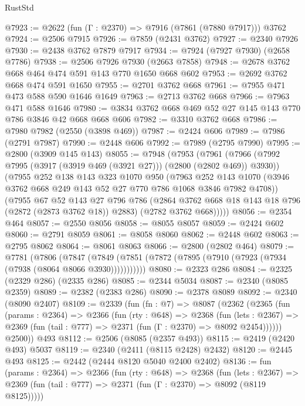 \begin{lexlean}{RustStd}
\begin{coremodule}
@7923 := @2622 (fun (Γ : @2370) => @7916 (@7861 (@7880 @7917))) @3762
@7924 := @2506 @7915
@7926 := @7859 (@2431 @3762)
@7927 := @2340 @7926
@7930 := @2438 @3762 @7879 @7917
@7934 := @7924 (@7927 @7930) (@2658 @7786)
@7938 := @2506 @7926 @7930 (@2663 @7858)
@7948 := @2678 @3762 @668 @464 @474 @591 @143 @770 @1650 @668 @602
@7953 := @2692 @3762 @668 @474 @591 @1650
@7955 := @2701 @3762 @668
@7961 := @7955 @471 @473 @588 @590 @1646 @1649
@7963 := @2713 @3762 @668
@7966 := @7963 @471 @588 @1646
@7980 := @3834 @3762 @668 @469 @52 @27 @145 @143 @770 @786 @3846 @42 @668 @668 @606
@7982 := @3310 @3762 @668
@7986 := @7980 @7982 (@2550 (@3898 @469))
@7987 := @2424 @606
@7989 := @7986 (@2791 @7987)
@7990 := @2448 @606
@7992 := @7989 (@2795 @7990)
@7995 := @2800 (@3909 @145 @143)
@8055 := @7948
    (@7953
      (@7961
        (@7966 (@7992 @7995 (@3917 (@3919 @469 (@3921 @27))) (@2800 (@2802 @469)) @3930))
        (@7955
          @252
          @138
          @143
          @323
          @1070
          @950
          (@7963
            @252
            @143
            @1070
            (@3946 @3762 @668 @249 @143 @52 @27 @770 @786 @1068 @3846 @7982 @4708))
          (@7955
            @67
            @52
            @143
            @27
            @796
            @786
            (@2864 @3762 @668 @18 @143 @18 @796 (@2872 (@2873 @3762 @18)) @2883)
            (@2782 @3762 @668)))))
@8056 := @2354 @464
@8057 := @2550 @8056
@8058 := @8055 @8057
@8059 := @2424 @602
@8060 := @2791 @8059
@8061 := @8058 @8060
@8062 := @2448 @602
@8063 := @2795 @8062
@8064 := @8061 @8063
@8066 := @2800 (@2802 @464)
@8079 := @7781
    (@7806
      (@7847 (@7849 (@7851 (@7872 (@7895 (@7910 (@7923 (@7934 (@7938 (@8064 @8066 @3930)))))))))))
@8080 := @2323 @286
@8084 := @2325 (@2329 @286) (@2335 @286)
@8085 := @2344 @5034
@8087 := @2340 (@8085 @2359)
@8089 := @2382 (@2383 @286)
@8090 := @2378 @8089
@8092 := @2340 (@8090 @2407)
@8109 := @2339
    (fun (fn : @7) =>
    @8087
      (@2362
        (@2365
          (fun (params : @2364) =>
          @2366
            (fun (rty : @648) =>
            @2368
              (fun (lets : @2367) =>
              @2369 (fun (tail : @777) => @2371 (fun (Γ : @2370) => @8092 @2454))))))
        @2500))
    @493
@8112 := @2506 (@8085 (@2357 @493))
@8115 := @2419 (@2420 @493) @5037
@8119 := @2340 (@2411 (@8115 @2428) @2432)
@8120 := @2445 @493
@8125 := @2442 (@2444 @8120 @5040 @2400 @2402)
@8136 := fun (params : @2364) =>
  @2366
    (fun (rty : @648) =>
    @2368
      (fun (lets : @2367) =>
      @2369 (fun (tail : @777) => @2371 (fun (Γ : @2370) => @8092 (@8119 @8125)))))

\end{coremodule}
\end{lexlean}
